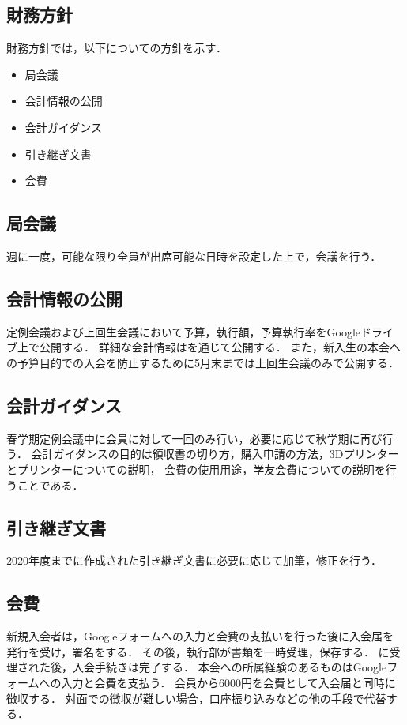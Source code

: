 \subsection*{財務方針}


財務方針では，以下についての方針を示す．
\begin{itemize}
  \item 局会議
  \item 会計情報の公開
  \item 会計ガイダンス
  \item 引き継ぎ文書
  \item 会費
\end{itemize}

\subsection*{局会議}
週に一度，可能な限り\kaikeiStaff{}全員が出席可能な日時を設定した上で，会議を行う．

\subsection*{会計情報の公開}
定例会議および上回生会議において予算，執行額，予算執行率をGoogleドライブ上で公開する．
詳細な会計情報は\kaikeiStaff{}を通じて公開する．
また，新入生の本会への予算目的での入会を防止するために5月末までは上回生会議のみで公開する．

\subsection*{会計ガイダンス}
春学期定例会議中に会員に対して一回のみ行い，必要に応じて秋学期に再び行う．
会計ガイダンスの目的は領収書の切り方，購入申請の方法，3Dプリンターとプリンターについての説明，
会費の使用用途，学友会費についての説明を行うことである．

\subsection*{引き継ぎ文書}
2020年度までに作成された引き継ぎ文書に必要に応じて加筆，修正を行う．

\subsection*{会費}
新規入会者は，Googleフォームへの入力と会費の支払いを行った後に入会届を発行を受け，署名をする．
その後，執行部が書類を一時受理，保存する．
\president{}に受理された後，入会手続きは完了する．
本会への所属経験のあるものはGoogleフォームへの入力と会費を支払う．
会員から6000円を会費として入会届と同時に徴収する．
対面での徴収が難しい場合，口座振り込みなどの他の手段で代替する．
